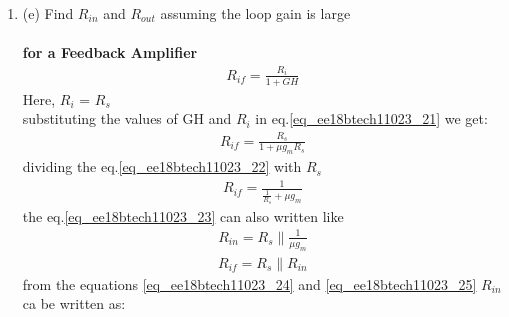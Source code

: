 \begin{enumerate}[label=\thesection.\arabic*.,ref=\thesection.\theenumi]
\item
\label{Question_1e_ee18btech11023}
(e) Find $R_{in}$ and $R_{out}$ assuming the loop gain is large\\
\solution\\
\textbf{for a Feedback Amplifier }
\begin{align}
    R_{if} = \frac{R_{i}}{1+GH}
    \label{eq_ee18btech11023_21}
\end{align}
Here,
    $R_{i}$ =  $R_{s}$\\
substituting the values of GH and $R_{i}$ in eq.\ref{eq_ee18btech11023_21}\;\;\; we get:
\begin{align}
    R_{if} = \frac{R_s}{1+\mu g_m R_s}
    \label{eq_ee18btech11023_22}
\end{align}
dividing the eq.\ref{eq_ee18btech11023_22} with $R_s$
\begin{align}
    R_{if} = \frac{1}{\frac{1}{R_s} + \mu g_m}
    \label{eq_ee18btech11023_23}
\end{align}
the eq.\ref{eq_ee18btech11023_23} can also written like
\begin{align}
    R_{in} = R_{s} \parallel  \frac{1}{\mu g_m}
    \label{eq_ee18btech11023_24}
\end{align}
\begin{align}
    R_{if} = R_s \parallel R_{in}
    \label{eq_ee18btech11023_25}
\end{align}
 from the equations \ref{eq_ee18btech11023_24} and \ref{eq_ee18btech11023_25} $R_{in}$ ca be written as:


\end{enumerate}
